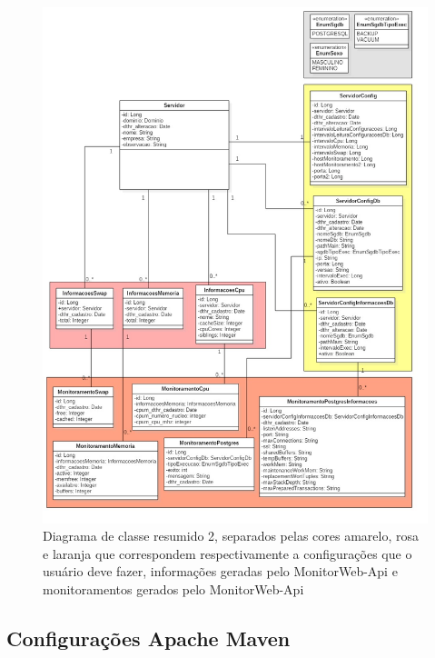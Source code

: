 \begin{figure}[H]
	\centering
	\includegraphics[width=1.0\textwidth]{figuras/DiagramaDeClassResumido.jpg}
	\caption[Diagrama de classe resumido 2.]{Diagrama de classe resumido 2, separados pelas cores amarelo, rosa e laranja que correspondem respectivamente a configurações que o usuário deve fazer, informações geradas pelo MonitorWeb-Api e monitoramentos gerados pelo MonitorWeb-Api}
	\label{Img:estruturaDePastaPojetoEntity}
	
\end{figure}












\subsection{Configurações Apache Maven}\label{subsec:ConfiguraçõesApacheMaven}

